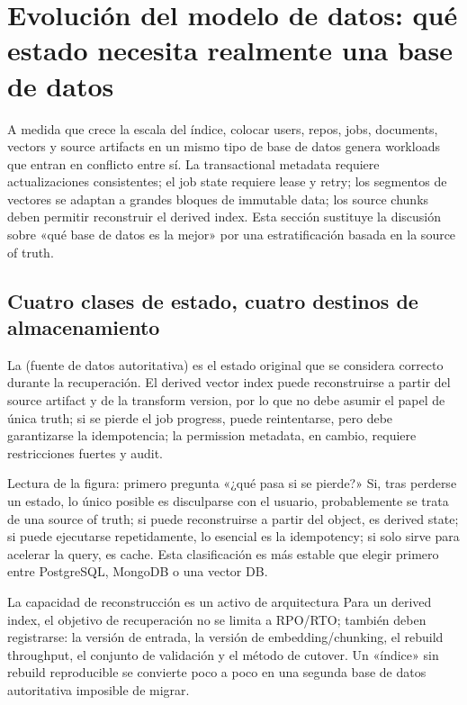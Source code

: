 \section{Evolución del modelo de datos: qué estado necesita realmente una base de datos}

A medida que crece la escala del índice, colocar users, repos, jobs, documents, vectors y source artifacts en un mismo tipo de base de datos genera workloads que entran en conflicto entre sí. La transactional metadata requiere actualizaciones consistentes; el job state requiere lease y retry; los segmentos de vectores se adaptan a grandes bloques de immutable data; los source chunks deben permitir reconstruir el derived index. Esta sección sustituye la discusión sobre «qué base de datos es la mejor» por una estratificación basada en la source of truth.

\subsection{Cuatro clases de estado, cuatro destinos de almacenamiento}

La  (fuente de datos autoritativa) es el estado original que se considera correcto durante la recuperación. El derived vector index puede reconstruirse a partir del source artifact y de la transform version, por lo que no debe asumir el papel de única truth; si se pierde el job progress, puede reintentarse, pero debe garantizarse la idempotencia; la permission metadata, en cambio, requiere restricciones fuertes y audit.


\begin{knowledgebox}{Lectura de la figura: primero pregunta «¿qué pasa si se pierde?»}
Si, tras perderse un estado, lo único posible es disculparse con el usuario, probablemente se trata de una source of truth; si puede reconstruirse a partir del object, es derived state; si puede ejecutarse repetidamente, lo esencial es la idempotency; si solo sirve para acelerar la query, es cache. Esta clasificación es más estable que elegir primero entre PostgreSQL, MongoDB o una vector DB.
\end{knowledgebox}

\begin{importantbox}{La capacidad de reconstrucción es un activo de arquitectura}
Para un derived index, el objetivo de recuperación no se limita a RPO/RTO; también deben registrarse: la versión de entrada, la versión de embedding/chunking, el rebuild throughput, el conjunto de validación y el método de cutover. Un «índice» sin rebuild reproducible se convierte poco a poco en una segunda base de datos autoritativa imposible de migrar.
\end{importantbox}

